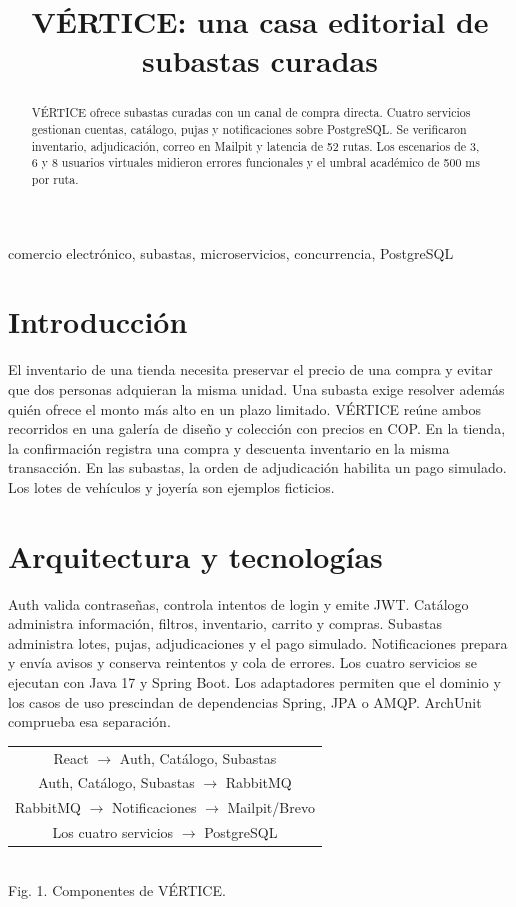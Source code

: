 \documentclass[conference]{IEEEtran}
\title{VÉRTICE: una casa editorial de subastas curadas}
\author{\IEEEauthorblockN{Equipo del proyecto ECOMMERCE\_FRANK}}
\begin{document}
\maketitle
\begin{abstract}
VÉRTICE ofrece subastas curadas con un canal de compra directa. Cuatro servicios gestionan cuentas, catálogo, pujas y notificaciones sobre PostgreSQL. Se verificaron inventario, adjudicación, correo en Mailpit y latencia de 52 rutas. Los escenarios de 3, 6 y 8 usuarios virtuales midieron errores funcionales y el umbral académico de 500 ms por ruta.
\end{abstract}
\begin{IEEEkeywords}
comercio electrónico, subastas, microservicios, concurrencia, PostgreSQL
\end{IEEEkeywords}
\section{Introducción}
El inventario de una tienda necesita preservar el precio de una compra y evitar que dos personas adquieran la misma unidad. Una subasta exige resolver además quién ofrece el monto más alto en un plazo limitado. VÉRTICE reúne ambos recorridos en una galería de diseño y colección con precios en COP. En la tienda, la confirmación registra una compra y descuenta inventario en la misma transacción. En las subastas, la orden de adjudicación habilita un pago simulado. Los lotes de vehículos y joyería son ejemplos ficticios.

\section{Arquitectura y tecnologías}
Auth valida contraseñas, controla intentos de login y emite JWT. Catálogo administra información, filtros, inventario, carrito y compras. Subastas administra lotes, pujas, adjudicaciones y el pago simulado. Notificaciones prepara y envía avisos y conserva reintentos y cola de errores. Los cuatro servicios se ejecutan con Java 17 y Spring Boot. Los adaptadores permiten que el dominio y los casos de uso prescindan de dependencias Spring, JPA o AMQP. ArchUnit comprueba esa separación.

\begin{center}
\begin{tabular}{c}
React $\rightarrow$ Auth, Catálogo, Subastas\\
Auth, Catálogo, Subastas $\rightarrow$ RabbitMQ\\
RabbitMQ $\rightarrow$ Notificaciones $\rightarrow$ Mailpit/Brevo\\
Los cuatro servicios $\rightarrow$ PostgreSQL
\end{tabular}\\
Fig. 1. Componentes de VÉRTICE.
\end{center}
\end{document}
